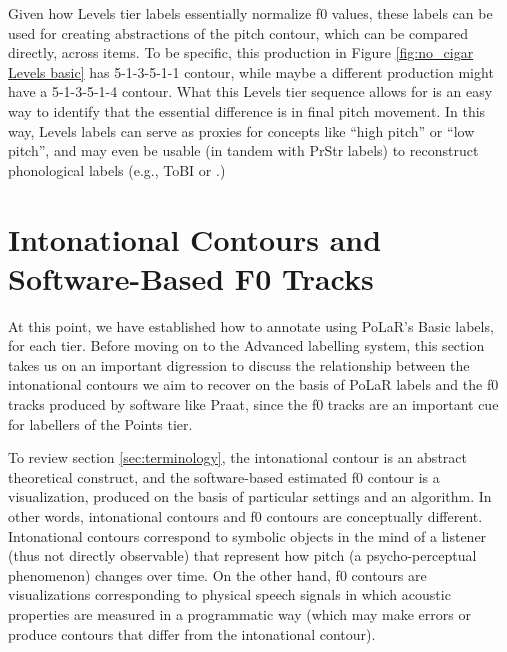 \documentclass[11pt, twoside]{memoir}
\def\polar#1{{\relsize{-.5}\fontspec[Mapping=tex-text]{Roboto Mono}{#1}}}
\def\tobi#1{\polar{#1}}
\begin{document}
Given how Levels tier labels essentially normalize f0 values, these labels can be used for creating abstractions of the pitch contour, which can be compared directly, across items. To be specific, this production in Figure \ref{fig:no_cigar Levels basic} has 5-1-3-5-1-1 contour, while maybe a different production might have a 5-1-3-5-1-4 contour. What this Levels tier sequence allows for is an easy way to identify that the essential difference is in final pitch movement. In this way, Levels labels can serve as proxies for concepts like “high pitch” or “low pitch”, and may even be usable (in tandem with PrStr labels) to reconstruct phonological labels (e.g., ToBI \tobi{H*} or \tobi{H\%}.)

\section{Intonational Contours and Software-Based F0 Tracks}\label{sec:intonational-contours-and-software-based-pitch-tracks}

At this point, we have established how to annotate using PoLaR’s Basic labels, for each tier. Before moving on to the Advanced labelling system, this section takes us on an important digression to discuss the relationship between the intonational contours we aim to recover on the basis of PoLaR labels and the f0 tracks produced by software like Praat, since the f0 tracks are an important cue for labellers of the Points tier.

To review section \ref{sec:terminology}, the intonational contour is an abstract theoretical construct, and the software-based estimated f0 contour is a visualization, produced on the basis of particular settings and an algorithm. In other words, intonational contours and f0 contours are conceptually different. Intonational contours correspond to symbolic objects in the mind of a listener (thus not directly observable) that represent how pitch (a psycho-perceptual phenomenon) changes over time. On the other hand, f0 contours are visualizations corresponding to physical speech signals in which acoustic properties are measured in a programmatic way (which may make errors or produce contours that differ from the intonational contour).
\end{document}
